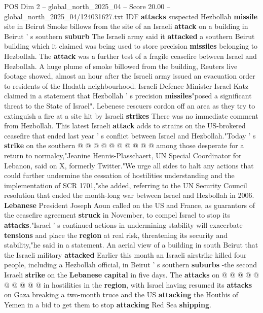 \begin{textsample}{POS Dim 2 – global\_north\_2025\_04 – Score 20.00 – global\_north\_2025\_04/124031627.txt}  \label{ex:f2_pos_422}
IDF \textbf{attacks} suspected Hezbollah \textbf{missile} site in Beirut Smoke billows from the site of an Israeli \textbf{attack} on a building in Beirut ' s southern \textbf{suburb} The Israeli army said it \textbf{attacked} a southern Beirut building which it claimed was being used to store precision \textbf{missiles} belonging to Hezbollah.
The \textbf{attack} was a further test of a fragile ceasefire between Israel and Hezbollah.
A huge plume of smoke billowed from the building, Reuters live footage showed, almost an hour after the Israeli army issued an evacuation order to residents of the Hadath neighbourhood.
Israeli Defence Minister Israel Katz claimed in a statement that Hezbollah ' s precision \textbf{missiles}"posed a significant threat to the State of Israel".
Lebenese rescuers cordon off an area as they try to extinguish a fire at a site hit by Israeli \textbf{strikes} There was no immediate comment from Hezbollah.
This latest Israeli \textbf{attack} adds to strains on the US-brokered ceasefire that ended last year ' s conflict between Israel and Hezbollah."Today ' s \textbf{strike} on the southern @ @ @ @ @ @ @ @ @ @ among those desperate for a return to normalcy,"Jeanine Hennis-Plasschaert, UN Special Coordinator for Lebanon, said on X, formerly Twitter."We urge all sides to halt any actions that could further undermine the cessation of hostilities understanding and the implementation of SCR 1701,"she added, referring to the UN Security Council resolution that ended the month-long war between Israel and Hezbollah in 2006. \textbf{Lebanese} President Joseph Aoun called on the US and France, as guarantors of the ceasefire agreement \textbf{struck} in November, to compel Israel to stop its \textbf{attacks}."Israel ' s continued actions in undermining stability will exacerbate \textbf{tensions} and place the \textbf{region} at real risk, threatening its security and stability,"he said in a statement.
An aerial view of a building in south Beirut that the Israeli military \textbf{attacked} Earlier this month an Israeli airstrike killed four people, including a Hezbollah official, in Beirut ' s southern \textbf{suburbs} -the second Israeli \textbf{strike} on the \textbf{Lebanese} \textbf{capital} in five days.
The \textbf{attacks} on @ @ @ @ @ @ @ @ @ @ in hostilities in the \textbf{region}, with Israel having resumed its \textbf{attacks} on Gaza breaking a two-month truce and the US \textbf{attacking} the Houthis of Yemen in a bid to get them to stop \textbf{attacking} Red Sea \textbf{shipping}.

\end{textsample}
